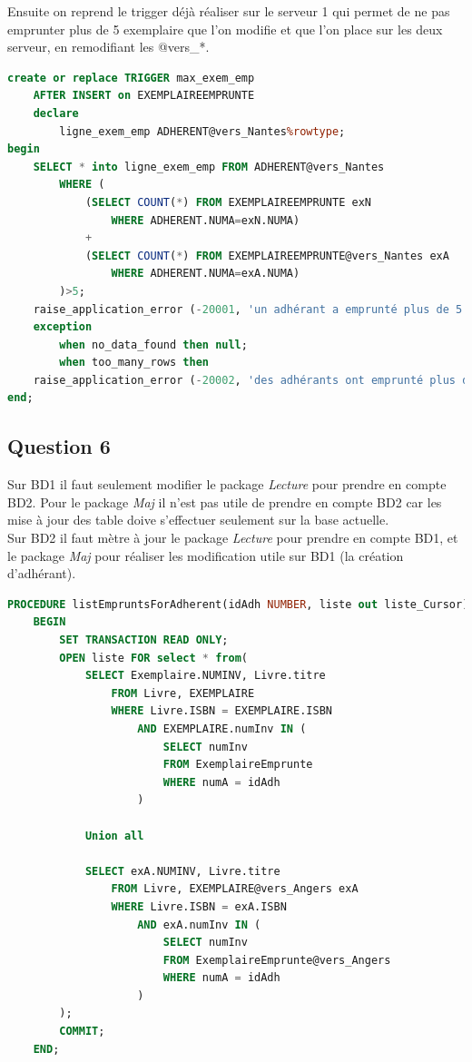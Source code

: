 \documentclass{article}
\begin{document}
Ensuite on reprend le trigger déjà réaliser sur le serveur 1 qui permet de ne pas emprunter plus de 5 exemplaire que l'on modifie et que l'on place sur les deux serveur, en remodifiant les @vers\_*.
\begin{lstlisting}[language=SQL, caption= Trigger: Max exemplaire DB2]
create or replace TRIGGER max_exem_emp
    AFTER INSERT on EXEMPLAIREEMPRUNTE
    declare
        ligne_exem_emp ADHERENT@vers_Nantes%rowtype;
begin
    SELECT * into ligne_exem_emp FROM ADHERENT@vers_Nantes 
        WHERE (
            (SELECT COUNT(*) FROM EXEMPLAIREEMPRUNTE exN
                WHERE ADHERENT.NUMA=exN.NUMA)
            +
            (SELECT COUNT(*) FROM EXEMPLAIREEMPRUNTE@vers_Nantes exA
                WHERE ADHERENT.NUMA=exA.NUMA)
        )>5;
    raise_application_error (-20001, 'un adhérant a emprunté plus de 5 exemplaires');
    exception
        when no_data_found then null;
        when too_many_rows then
    raise_application_error (-20002, 'des adhérants ont emprunté plus de 5 exemplaires');
end;
\end{lstlisting}

\subsection{Question 6}
Sur BD1 il faut seulement modifier le package \textit{Lecture} pour prendre en compte BD2. Pour le package \textit{Maj} il n'est pas utile de prendre en compte BD2 car les mise à jour des table doive s'effectuer seulement sur la base actuelle.
\\

Sur BD2 il faut mètre à jour le package \textit{Lecture} pour prendre en compte BD1, et le package \textit{Maj} pour réaliser les modification utile sur BD1 (la création d'adhérant).
\begin{lstlisting}[language=SQL, caption= Un procédure de \textit{Lecture} sur BD1]
PROCEDURE listEmpruntsForAdherent(idAdh NUMBER, liste out liste_Cursor) IS
    BEGIN
        SET TRANSACTION READ ONLY;
        OPEN liste FOR select * from(
            SELECT Exemplaire.NUMINV, Livre.titre
                FROM Livre, EXEMPLAIRE
                WHERE Livre.ISBN = EXEMPLAIRE.ISBN
                    AND EXEMPLAIRE.numInv IN (
                        SELECT numInv
                        FROM ExemplaireEmprunte
                        WHERE numA = idAdh
                    )

            Union all

            SELECT exA.NUMINV, Livre.titre
                FROM Livre, EXEMPLAIRE@vers_Angers exA
                WHERE Livre.ISBN = exA.ISBN
                    AND exA.numInv IN (
                        SELECT numInv
                        FROM ExemplaireEmprunte@vers_Angers
                        WHERE numA = idAdh
                    )
        );
        COMMIT;
    END;
\end{lstlisting}
\end{document}
